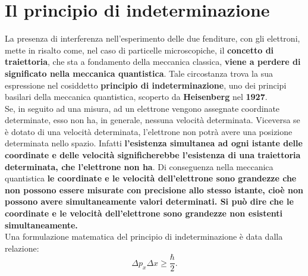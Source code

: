 \documentclass[a4paper,12pt,oneside]{book}
\begin{document}
\section{Il principio di indeterminazione}
La presenza di interferenza nell'esperimento delle due fenditure, con gli elettroni, mette in risalto come, nel caso di particelle microscopiche, il \textbf{concetto di traiettoria}, che sta a fondamento della meccanica classica, \textbf{viene a perdere di significato nella meccanica quantistica}. Tale circostanza trova la sua espressione nel cosiddetto \textbf{principio di indeterminazione}, uno dei principi basilari della meccanica quantistica, scoperto da \textbf{Heisenberg} nel \textbf{1927}.\\
Se, in seguito ad una misura, ad un elettrone vengono assegnate coordinate determinate, esso non ha, in generale, nessuna velocità determinata. Viceversa se è dotato di una velocità determinata, l'elettrone non potrà avere una posizione determinata nello spazio. Infatti \textbf{l'esistenza simultanea ad ogni istante delle coordinate e delle velocità significherebbe l'esistenza di una traiettoria determinata, che l'elettrone non ha}. Di conseguenza nella meccanica quantistica \textbf{le coordinate e le velocità dell'elettrone sono grandezze che non possono essere misurate con precisione allo stesso istante, cioè non possono avere simultaneamente valori determinati. Si può dire che le coordinate e le velocità dell'elettrone sono grandezze non esistenti simultaneamente.}\\
Una formulazione matematica del principio di indeterminazione è data dalla relazione:
	\begin{equation}
		\boxed{\boxed{
			\Delta p_x \Delta x \geq \frac{\hbar}{2}.
			}}
	\end{equation}
\end{document}
